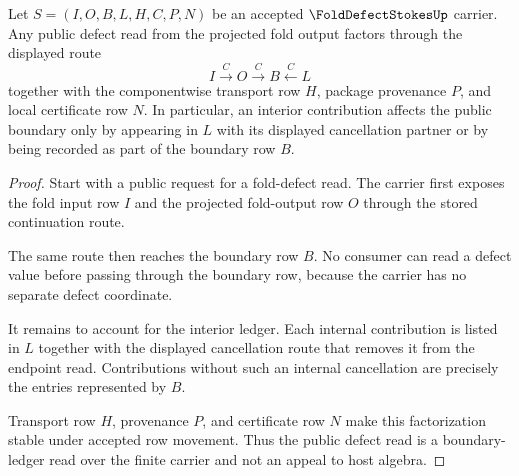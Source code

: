 \begin{theorem}
\label{thm:fold-defect-stokes-boundary-ledger}
Let $S=(I,O,B,L,H,C,P,N)$ be an accepted $\FoldDefectStokesUp$ carrier. Any public defect read from the projected fold output factors through the displayed route
$$
I \xrightarrow{C} O \xrightarrow{C} B \xleftarrow{C} L
$$
together with the componentwise transport row $H$, package provenance $P$, and local certificate row $N$. In particular, an interior contribution affects the public boundary only by appearing in $L$ with its displayed cancellation partner or by being recorded as part of the boundary row $B$.
\end{theorem}
\begin{proof}
Start with a public request for a fold-defect read. The carrier first exposes the fold input row $I$ and the projected fold-output row $O$ through the stored continuation route.

The same route then reaches the boundary row $B$. No consumer can read a defect value before passing through the boundary row, because the carrier has no separate defect coordinate.

It remains to account for the interior ledger. Each internal contribution is listed in $L$ together with the displayed cancellation route that removes it from the endpoint read. Contributions without such an internal cancellation are precisely the entries represented by $B$.

Transport row $H$, provenance $P$, and certificate row $N$ make this factorization stable under accepted row movement. Thus the public defect read is a boundary-ledger read over the finite carrier and not an appeal to host algebra.
\end{proof}

